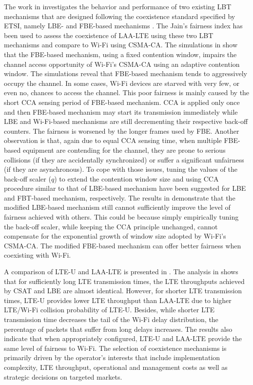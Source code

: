 The work in \cite{Enhanced-LTE-U-thesis-2015} investigates the behavior and performance of two existing LBT mechanisms that are designed following the coexistence standard specified by ETSI, namely LBE- and FBE-based mechanisms \cite{LBT-ETSI-2014}. The Jain's fairness index has been used to assess the coexistence of LAA-LTE using these two LBT mechanisms and compare to Wi-Fi using CSMA-CA. The simulations in \cite{Enhanced-LTE-U-thesis-2015} show that the FBE-based mechanism, using a fixed contention window, impairs the channel access opportunity of Wi-Fi's CSMA-CA using an adaptive contention window. The simulations reveal that FBE-based mechanism tends to aggressively occupy the channel. In some cases, Wi-Fi devices are starved with very few, or even no, chances to access the channel. This poor fairness is mainly caused by the short CCA sensing period of FBE-based mechanism. CCA is applied only once and then FBE-based mechanism may start its transmission immediately while LBE and Wi-Fi-based mechanisms are still decrementing their respective back-off counters. The fairness is worsened by the longer frames used by FBE. Another observation is that, again due to equal CCA sensing time, when multiple FBE-based equipment are contending for the channel, they are prone to serious collisions (if they are accidentally synchronized) or suffer a significant unfairness (if they are asynchronous). To cope with those issues, tuning the values of the back-off scaler ($q$) to extend the contention window size and using CCA procedure similar to that of LBE-based mechanism have been suggested for LBE and FBT-based mechanism, respectively. The results in \cite{Enhanced-LTE-U-thesis-2015} demonstrate that the modified LBE-based mechanism still cannot sufficiently improve the level of fairness achieved with others. This could be because simply empirically tuning the back-off scaler, while keeping the CCA principle unchanged, cannot compensate for the exponential growth of window size adopted by Wi-Fi's CSMA-CA. The modified FBE-based mechanism can offer better fairness when coexisting with Wi-Fi.

A comparison of LTE-U and LAA-LTE is presented in \cite{LBT-CSAT-2015}. The analysis in \cite{LBT-CSAT-2015} shows that for sufficiently long LTE transmission times, the LTE throughputs achieved by CSAT and LBE are almost identical. However, for shorter LTE transmission times, LTE-U provides lower LTE throughput than LAA-LTE due to higher LTE/Wi-Fi collision probability of LTE-U. Besides, while shorter LTE transmission time decreases the tail of the Wi-Fi delay distribution, the percentage of packets that suffer from long delays increases. The results also indicate that when appropriately configured, LTE-U and LAA-LTE provide the same level of fairness to Wi-Fi. The selection of coexistence mechanisms is primarily driven by the operator's interests that include implementation complexity, LTE throughput, operational and management costs as well as strategic decisions on targeted markets.

